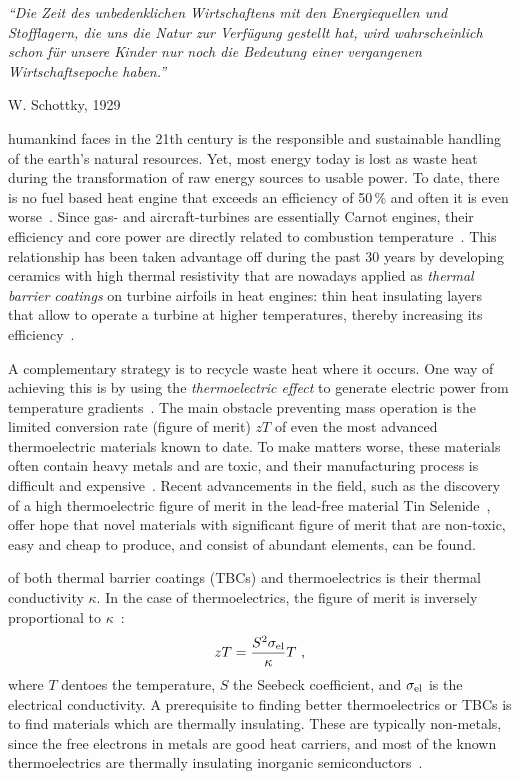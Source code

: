 \epigraph{\singlespacing \it ``Die Zeit des unbedenklichen Wirtschaftens mit den Energiequellen und Stofflagern, die uns die Natur zur Verfügung gestellt hat, wird wahrscheinlich schon für unsere Kinder nur noch die Bedeutung einer vergangenen Wirtschaftsepoche haben.''}{W. Schottky, 1929~\cite{Schottky1929}}
 humankind faces in the 21th century is the responsible and sustainable handling of the earth's natural resources.  Yet, most energy today is lost as waste heat during the transformation of raw energy sources to usable power. To date, there is no fuel based heat engine that exceeds an efficiency of 50\,\% and often it is even worse~\cite{eia}. 
Since gas- and aircraft-turbines are essentially Carnot engines, their efficiency and core power are directly related to combustion temperature~\cite{Clarke2012,Perepezko2009}. This relationship has been taken advantage off during the past 30 years by developing 
ceramics with high thermal resistivity that are nowadays applied as \emph{thermal barrier coatings} on turbine airfoils in heat engines: thin heat insulating layers that allow to operate a turbine at higher temperatures, thereby increasing its efficiency~\cite{Clarke2003}.

A complementary strategy is to recycle waste heat where it occurs. One way of achieving this is by using the \emph{thermoelectric effect} to  generate electric power from temperature gradients~\cite{Snyder2008}. The main obstacle preventing mass operation is the limited conversion rate (figure of merit) $zT$ of even the most advanced thermoelectric materials known to date. To make matters worse, these materials often contain heavy metals and are toxic, and their manufacturing process is difficult and expensive~\cite{Nolas2001}. Recent advancements in the field, such as the discovery of a high thermoelectric figure of merit in the lead-free material Tin Selenide~\cite{zhao2014}, offer hope that novel materials with significant figure of merit that are non-toxic, easy and cheap to produce, and consist of abundant elements, can be found.

 of both thermal barrier coatings (TBCs) and thermoelectrics is their thermal conductivity $\kappa$. In the case of thermoelectrics, the figure of merit is inversely proportional to $\kappa$~\cite{Nolas2001}:
\begin{align}
zT = \frac{S^2 \sigma_{\rm el}}{\kappa} T~,
\label{eq:zT}
\end{align} 
where $T$ dentoes the temperature, $S$ the Seebeck coefficient, and $\sigma_{\rm el}$ is the electrical conductivity.
A prerequisite to finding better thermoelectrics or TBCs is to find materials which are thermally insulating. These are typically non-metals, since the free electrons in metals are good heat carriers, and most of the known thermoelectrics are thermally insulating inorganic semiconductors~\cite[p.\,15]{Nolas2001}.

